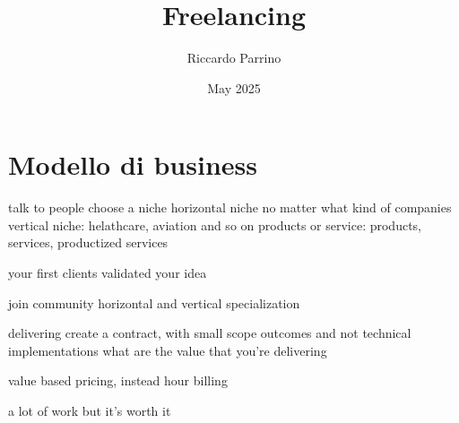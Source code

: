 \documentclass{article}
\title{Freelancing}
\author{Riccardo Parrino}
\date{May 2025}
\begin{document}
\maketitle

\section{Modello di business}
talk to people
choose a niche
horizontal niche no matter what kind of companies
vertical niche: helathcare, aviation and so on
products or service: products, services, productized services 

your first clients
validated your idea

join community
horizontal and vertical specialization

delivering
create a contract, with small scope
outcomes and not technical implementations
what are the value that you're delivering

value based pricing, instead hour billing

a lot of work but it's worth it
\end{document}

